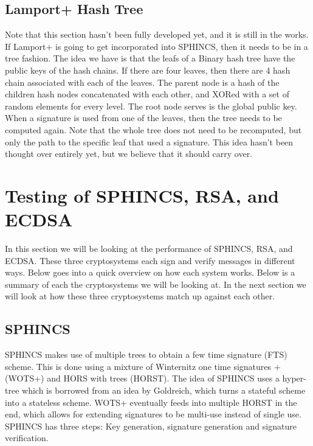 \documentclass[]{scrartcl}
\begin{document}

\subsection*{Lamport+ Hash Tree}
Note that this section hasn't been fully developed yet, and it is still in the works. If Lamport+ is going to get incorporated into SPHINCS, then it needs to be in a tree fashion. The idea we have is that the leafs of a Binary hash tree have the public keys of the hash chains. If there are four leaves, then there are 4 hash chain associated with each of the leaves. The parent node is a hash of the children hash nodes concatenated with each other, and XORed with a set of random elements for every level. The root node serves is the global public key.\\
When a signature is used from one of the leaves, then the tree needs to be computed again. Note that the whole tree does not need to be recomputed, but only the path to the specific leaf that used a signature. This idea hasn't been thought over entirely yet, but we believe that it should carry over.

\section*{Testing of SPHINCS, RSA, and ECDSA}
In this section we will be looking at the performance of SPHINCS, RSA, and ECDSA. These three cryptosystems each sign and verify messages in different ways. Below goes into a quick overview on how each system works. Below is a summary of each the cryptosystems we will be looking at. In the next section we will look at how these three cryptosystems match up against each other.

\subsection*{SPHINCS}
SPHINCS makes use of multiple trees to obtain a few time signature (FTS) scheme. This is done using a mixture of Winternitz one time signatures + (WOTS+) and HORS with trees (HORST). The idea of SPHINCS uses a hyper-tree which is borrowed from an idea by Goldreich, which turns a stateful scheme into a stateless scheme. WOTS+ eventually feeds into multiple HORST in the end, which allows for extending signatures to be multi-use instead of single use. SPHINCS has three steps: Key generation, signature generation and signature verification.
\end{document}
